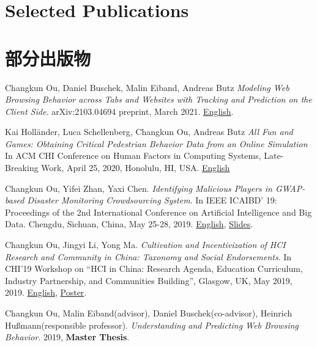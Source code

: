  {
    \section{\textbf{Selected Publications}}
}{
    \section{\textbf{部分出版物}}
}

 \resumeSubHeadingListStart
    \item{
        Changkun Ou, Daniel Buschek, Malin Eiband, Andreas Butz
        \emph{Modeling Web Browsing Behavior across Tabs and Websites with Tracking and Prediction on the Client Side}. arXiv:2103.04694 preprint, March 2021. \href{https://arxiv.org/abs/2103.04694}{English}.
    }
    \item{
        Kai Holländer, Luca Schellenberg, Changkun Ou, Andreas Butz
        \emph{All Fun and Games: Obtaining Critical Pedestrian Behavior Data from an Online Simulation}
        In ACM CHI Conference on Human Factors in Computing Systems, Late-Breaking Work, April 25, 2020, Honolulu, HI, USA.
        \href{http://www.medien.ifi.lmu.de/pubdb/publications/pub/hollaender2020chi-lbw/hollaender2020chi-lbw.pdf}{English}
    }
    \item{
        Changkun Ou, Yifei Zhan, Yaxi Chen.
        \emph{Identifying Malicious Players in GWAP-based Disaster Monitoring Crowdsourcing System}. 
        In IEEE ICAIBD' 19: Proceedings of the 2nd International Conference on Artificial Intelligence and Big Data. Chengdu, Sichuan, China, May 25-28, 2019.
        \href{https://github.com/changkun/research/blob/master/papers/ou2019gwap.pdf}{English},
        \href{https://github.com/changkun/research/blob/master/papers/ou2019gwap-slides.pdf}{Slides}.
    }
    \item{
        Changkun Ou, Jingyi Li, Yong Ma.
        \emph{Cultivation and Incentivization of HCI Research and Community in China: Taxonomy and Social Endorsements}. 
        In CHI'19 Workshop on ``HCI in China: Research Agenda, Education Curriculum, Industry Partnership, and Communities Building'', Glasgow, UK, May 2019, 2019.
        \href{https://github.com/changkun/research/blob/master/papers/ou2019chi-paper.pdf}{English},
        \href{https://github.com/changkun/research/blob/master/papers/ou2019chi-poster.pdf}{Poster}.
    }
    \item{
        Changkun Ou, Malin Eiband(advisor), Daniel Buschek(co-advisor), Heinrich Hußmann(responsible professor).
        \emph{Understanding and Predicting Web Browsing Behavior}. 
        2019, \textbf{Master Thesis}.
    }
